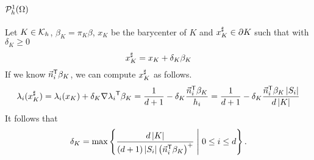 %
\subsection{$\Pspace^1_h(\Omega)$}\label{subsec:}
%
%
Let $K\in\Cells_h$, $\beta_K=\pi_K\beta$, $x_K$ be the barycenter of $K$ and $\xup\in\partial K$ such that  with 
$\delta_K\ge0$
%
\begin{equation}\label{eq:}
\xup = x_K + \delta_K \beta_K
\end{equation}
%
If we know $\transpose{\normal[i]}\beta_K$, we can compute $\xup$ as follows.
%
\begin{align*}
\lambda_i(\xup) = \lambda_i(x_K) + \delta_K \transpose{\nabla\lambda_i}\beta_K
= \frac{1}{d+1} - \delta_K \frac{\transpose{\normal[i]}\beta_K}{h_i}
= \frac{1}{d+1} - \delta_K \frac{\transpose{\normal[i]}\beta_K \abs{S_i}}{d\abs{K}}
\end{align*}
%
It follows that
%
\begin{equation}\label{eq:}
\delta_K = \max\SetDef{\frac{d\abs{K}}{(d+1)\abs{S_i}\left(\transpose{\normal[i]}\beta_K\right)^+}}{0\le i\le d}.
\end{equation}
%


\printbibliography[title=References Section~\thesection]

